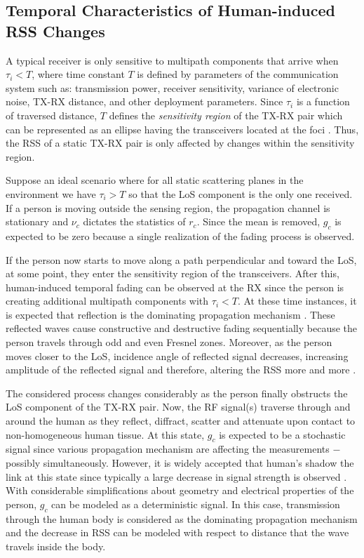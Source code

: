 \documentclass[journal, 10pt, twocolumn, balance]{IEEEtran}
\begin{document}
\subsection{Temporal Characteristics of Human-induced RSS Changes}\label{S:temporal_characteristics}

A typical receiver is only sensitive to multipath components that arrive when $\tau_i < T$, where time constant $T$ is defined by parameters of the communication system such as: transmission power, receiver sensitivity, variance of electronic noise, TX-RX distance, and other deployment parameters. Since $\tau_i$ is a function of traversed distance, $T$ defines the \emph{sensitivity region} of the TX-RX pair which can be represented as an ellipse having the transceivers located at the foci \cite{Chang2004}. Thus, the RSS of a static TX-RX pair is only affected by changes within the sensitivity region.

Suppose an ideal scenario where for all static scattering planes in the environment we have $\tau_i > T$ so that the LoS component is the only one received. If a person is moving outside the sensing region, the propagation channel is stationary and $\nu_c$ dictates the statistics of $r_c$. Since the mean is removed, $g_c$ is expected to be zero because a single realization of the fading process is observed.

If the person now starts to move along a path perpendicular and toward the LoS, at some point, they enter the sensitivity region of the transceivers. After this, human-induced temporal fading can be observed at the RX since the person is creating additional multipath components with $\tau_i < T$. At these time instances, it is expected that reflection is the dominating propagation mechanism \cite{patwari2011b}. These reflected waves cause constructive and destructive fading sequentially because the person travels through odd and even Fresnel zones. Moreover, as the person moves closer to the LoS, incidence angle of reflected signal decreases, increasing amplitude of the reflected signal and therefore, altering the RSS more and more \cite[pp. 114-125]{rappaport1996}.

The considered process changes considerably as the person finally obstructs the LoS component of the TX-RX pair. Now, the RF signal(s) traverse through and around the human as they reflect, diffract, scatter and attenuate upon contact to non-homogeneous human tissue. At this state, $g_c$ is expected to be a stochastic signal since various propagation mechanism are affecting the measurements $-$ possibly simultaneously.  However, it is widely accepted that human's shadow the link at this state since typically a large decrease in signal strength is observed \cite{patwari08, li2011, Guo2013}. With considerable simplifications about geometry and electrical properties of the person, $g_c$ can be modeled as a deterministic signal. In this case, transmission through the human body is considered as the dominating propagation mechanism and the decrease in RSS can be modeled with respect to distance that the wave travels inside the body.  
\end{document}
